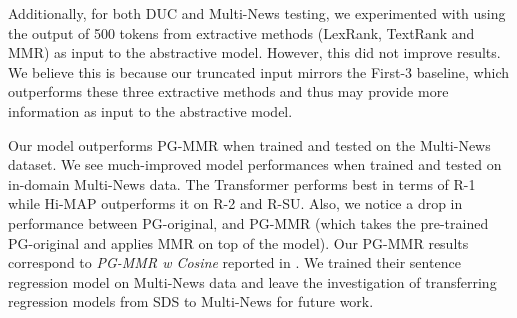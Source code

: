 \documentclass[11pt,a4paper]{article}
\begin{document}
\begin{table}[t!]
\centering
\small
{}
\caption{Number of times a system was chosen as best in pairwise comparisons according to informativeness, fluency and non-redundancy.}
\label{tab:evaluation}
\vspace{-3mm}
\end{table}

Additionally, for both DUC and Multi-News testing, we experimented with using the output of 500 tokens from extractive methods (LexRank, TextRank and MMR) as input to the abstractive model. However, this did not improve results. We believe this is because our truncated input mirrors the First-3 baseline, which outperforms these three extractive methods and thus may provide more information as input to the abstractive model. 


Our model outperforms PG-MMR when trained and tested on the Multi-News dataset. We see much-improved model performances when trained and tested on in-domain Multi-News data. The Transformer performs best in terms of R-1 while Hi-MAP outperforms it on R-2 and R-SU. Also, we notice a drop in performance between PG-original, and PG-MMR (which takes the pre-trained PG-original and applies MMR on top of the model). Our PG-MMR results correspond to \textit{PG-MMR w\/ Cosine} reported in . 
We trained their sentence regression model on Multi-News data and leave the investigation of transferring regression models from SDS to Multi-News for future work. 
\end{document}
